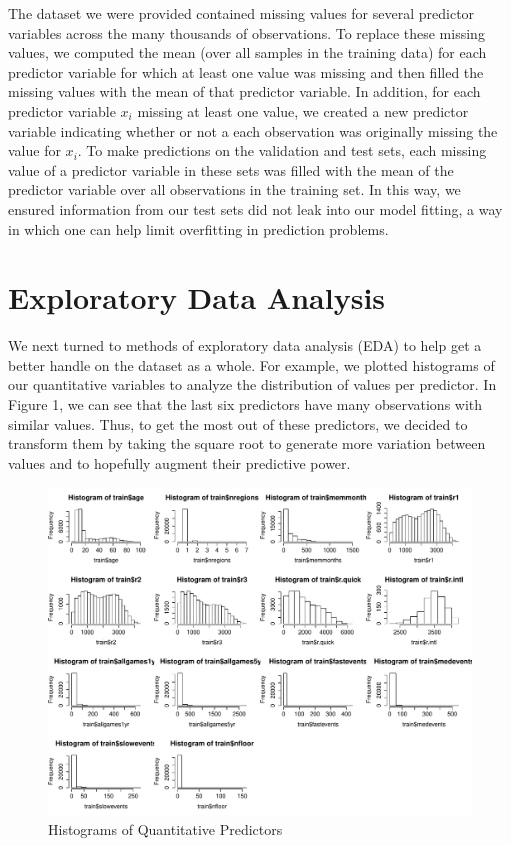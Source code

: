 \documentclass[11pt, oneside]{article}   	%
\begin{document}
The dataset we were provided contained missing values for several predictor variables across the many thousands of observations.  To replace these missing values, we computed the mean (over all samples in the training data) for each predictor variable for which at least one value was missing and then filled the missing values with the mean of that predictor variable.  In addition, for each predictor variable $x_i$ missing at least one value, we created a new predictor variable indicating whether or not a each observation was originally missing the value for $x_i$.  To make predictions on the validation and test sets, each missing value of a predictor variable in these sets was filled with the mean of the predictor variable over all observations in the training set. In this way, we ensured information from our test sets did not leak into our model fitting, a way in which one can help limit overfitting in prediction problems.

\section {Exploratory Data Analysis}
We next turned to methods of exploratory data analysis (EDA) to help get a better handle on the dataset as a whole. For example, we plotted histograms of our quantitative variables to analyze the distribution of values per predictor. In Figure 1, we can see that the last six predictors have many observations with similar values. Thus, to get the most out of these predictors, we decided to transform them by taking the square root to generate more variation between values and to hopefully augment their predictive power.
  \FloatBarrier
  \begin{figure}[!ht]
    \centering
    \includegraphics[width=\textwidth]{histograms_of_quant_vars}
    \caption{Histograms of Quantitative Predictors}
  \end{figure}
  \FloatBarrier
\end{document}
